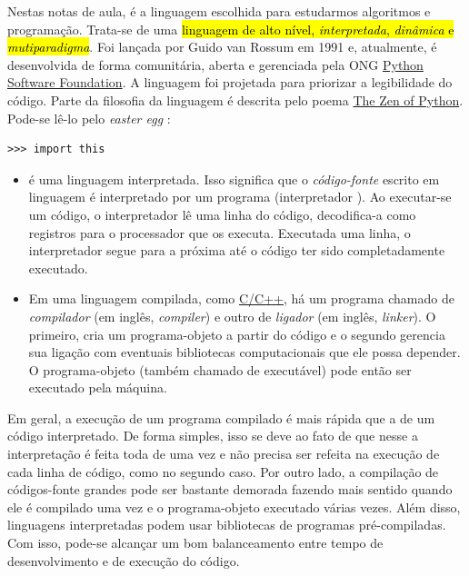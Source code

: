 Nestas notas de aula, \hl{{\python}} é a linguagem escolhida para estudarmos algoritmos e programação. Trata-se de uma \hl{linguagem de alto nível, \emph{interpretada}, \emph{dinâmica} e \emph{mutiparadigma}}. Foi lançada por Guido van Rossum{\rossum} em 1991 e, atualmente, é desenvolvida de forma comunitária, aberta e gerenciada pela ONG \href{https://pt.wikipedia.org/wiki/Python_Software_Foundation}{Python Software Foundation}. A linguagem foi projetada para priorizar a legibilidade do código. Parte da filosofia da linguagem é descrita pelo poema \href{https://pt.wikipedia.org/wiki/Zen_de_Python}{The Zen of Python}. Pode-se lê-lo pelo \textit{easter egg} {\python}:

\begin{lstlisting}
>>> import this
\end{lstlisting}

\begin{itemize}
\item {}

  {\python} é uma linguagem interpretada. Isso significa que o \emph{código-fonte} escrito em linguagem {\python} é interpretado por um programa (interpretador {\python}). Ao executar-se um código, o interpretador lê uma linha do código, decodifica-a como registros para o processador que os executa. Executada uma linha, o interpretador segue para a próxima até o código ter sido completadamente executado.

\item {}

  Em uma linguagem compilada, como \href{https://pt.wikipedia.org/wiki/C\%2B\%2B}{C/C++}, há um programa chamado de \emph{compilador} (em inglês, \textit{compiler}) e outro de \emph{ligador} (em inglês, \textit{linker}). O primeiro, cria um programa-objeto a partir do código e o segundo gerencia sua ligação com eventuais bibliotecas computacionais que ele possa depender. O programa-objeto (também chamado de executável) pode então ser executado pela máquina.
\end{itemize}

Em geral, a execução de um programa compilado é mais rápida que a de um código interpretado. De forma simples, isso se deve ao fato de que nesse a interpretação é feita toda de uma vez e não precisa ser refeita na execução de cada linha de código, como no segundo caso. Por outro lado, a compilação de códigos-fonte grandes pode ser bastante demorada fazendo mais sentido quando ele é compilado uma vez e o programa-objeto executado várias vezes. Além disso, linguagens interpretadas podem usar bibliotecas de programas pré-compiladas. Com isso, pode-se alcançar um bom balanceamento entre tempo de desenvolvimento e de execução do código.

